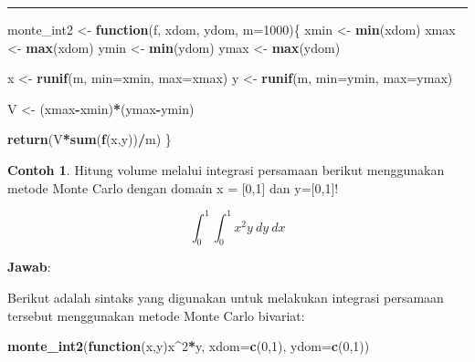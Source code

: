 \documentclass[
]{book}
\newenvironment{Shaded}{\begin{snugshade}}{\end{snugshade}}
\newcommand{\AttributeTok}[1]{\textcolor[rgb]{0.13,0.29,0.53}{#1}}
\newcommand{\ControlFlowTok}[1]{\textcolor[rgb]{0.13,0.29,0.53}{\textbf{#1}}}
\newcommand{\DecValTok}[1]{\textcolor[rgb]{0.00,0.00,0.81}{#1}}
\newcommand{\FunctionTok}[1]{\textcolor[rgb]{0.13,0.29,0.53}{\textbf{#1}}}
\newcommand{\NormalTok}[1]{#1}
\newcommand{\OtherTok}[1]{\textcolor[rgb]{0.56,0.35,0.01}{#1}}
\newcommand{\SpecialCharTok}[1]{\textcolor[rgb]{0.81,0.36,0.00}{\textbf{#1}}}
\theoremstyle{definition}
\theoremstyle{definition}
\newtheorem{example}{Contoh}[chapter]
\theoremstyle{definition}
\theoremstyle{definition}
\theoremstyle{remark}
\begin{document}
\begin{center}\rule{0.5\linewidth}{0.5pt}\end{center}

\begin{Shaded}
\begin{Highlighting}[]
\NormalTok{monte\_int2 }\OtherTok{\textless{}{-}} \ControlFlowTok{function}\NormalTok{(f, xdom, ydom, }\AttributeTok{m=}\DecValTok{1000}\NormalTok{)\{}
\NormalTok{  xmin }\OtherTok{\textless{}{-}} \FunctionTok{min}\NormalTok{(xdom)}
\NormalTok{  xmax }\OtherTok{\textless{}{-}} \FunctionTok{max}\NormalTok{(xdom)}
\NormalTok{  ymin }\OtherTok{\textless{}{-}} \FunctionTok{min}\NormalTok{(ydom)}
\NormalTok{  ymax }\OtherTok{\textless{}{-}} \FunctionTok{max}\NormalTok{(ydom)}
  
\NormalTok{  x }\OtherTok{\textless{}{-}} \FunctionTok{runif}\NormalTok{(m, }\AttributeTok{min=}\NormalTok{xmin, }\AttributeTok{max=}\NormalTok{xmax)}
\NormalTok{  y }\OtherTok{\textless{}{-}} \FunctionTok{runif}\NormalTok{(m, }\AttributeTok{min=}\NormalTok{ymin, }\AttributeTok{max=}\NormalTok{ymax)}
  
\NormalTok{  V }\OtherTok{\textless{}{-}}\NormalTok{ (xmax}\SpecialCharTok{{-}}\NormalTok{xmin)}\SpecialCharTok{*}\NormalTok{(ymax}\SpecialCharTok{{-}}\NormalTok{ymin)}
  
  \FunctionTok{return}\NormalTok{(V}\SpecialCharTok{*}\FunctionTok{sum}\NormalTok{(}\FunctionTok{f}\NormalTok{(x,y))}\SpecialCharTok{/}\NormalTok{m)}
\NormalTok{\}}
\end{Highlighting}
\end{Shaded}

\begin{example}
\protect\hypertarget{exm:monteexm2}{}\label{exm:monteexm2}Hitung volume melalui integrasi persamaan berikut menggunakan metode Monte Carlo dengan domain x = {[}0,1{]} dan y={[}0,1{]}!
\end{example}

\[
\int_{0}^1 \int_{0}^1 x^2y \ dy \ dx
\]

\textbf{Jawab}:

Berikut adalah sintaks yang digunakan untuk melakukan integrasi persamaan tersebut menggunakan metode Monte Carlo bivariat:

\begin{Shaded}
\begin{Highlighting}[]
\FunctionTok{monte\_int2}\NormalTok{(}\ControlFlowTok{function}\NormalTok{(x,y)x}\SpecialCharTok{\^{}}\DecValTok{2}\SpecialCharTok{*}\NormalTok{y,}
           \AttributeTok{xdom=}\FunctionTok{c}\NormalTok{(}\DecValTok{0}\NormalTok{,}\DecValTok{1}\NormalTok{), }\AttributeTok{ydom=}\FunctionTok{c}\NormalTok{(}\DecValTok{0}\NormalTok{,}\DecValTok{1}\NormalTok{))}
\end{Highlighting}
\end{Shaded}
\end{document}
